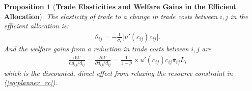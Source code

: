 \documentclass[12pt,pdftex]{article}
\newtheorem{prp}{Proposition}
\begin{document}
\begin{onehalfspacing}
\begin{prp}[\textbf{Trade Elasticities and Welfare Gains in the Efficient Allocation}]\label{apx-prp:gains-efficient-allocation} The elasticity of trade to a change in trade costs between $i,j$ in the efficient allocation is:
\begin{align}
\theta_{ij} =  -\frac{1}{\sigma_{\epsilon}} \bigg [ u'(c_{ij}) c_{ij} \bigg]. \label{apx-eq:eff-trade-elasticity}
\end{align}
And the welfare gains from a reduction in trade costs between $i,j$ are
\begin{align}
\frac{\mathrm{d} W}{\mathrm{d} d_{ij} / d_{ij}} = \frac{\partial W}{\partial d_{ij} / d_{ij}} = \frac{1}{1-\beta} \times u'(c_{ij}) c_{ij} \pi_{ij} L_i
\label{eq:eff-trade-gains}
\end{align}
which is the discounted, direct effect from relaxing the resource constraint in (\ref{eq:planner_rc}).
\end{prp}



\end{onehalfspacing}
\end{document}
